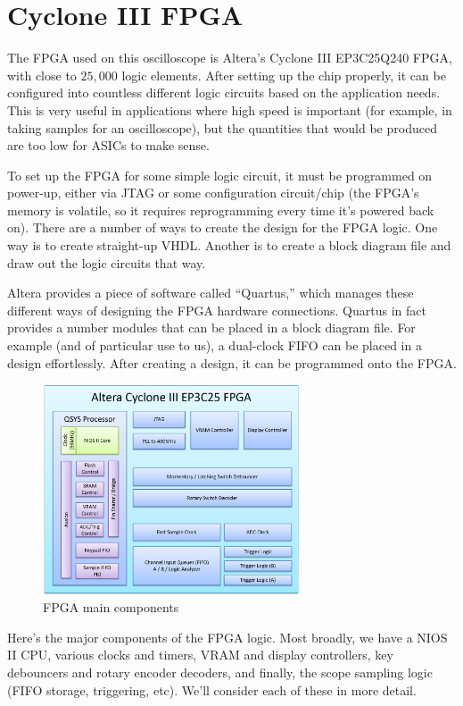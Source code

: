 \section{Cyclone III FPGA}
The FPGA used on this oscilloscope is Altera's Cyclone III EP3C25Q240 FPGA, with close to $25,000$ logic elements. After setting up the chip properly, it can be configured into countless different logic circuits based on the application needs. This is very useful in applications where high speed is important (for example, in taking samples for an oscilloscope), but the quantities that would be produced are too low for ASICs to make sense.

To set up the FPGA for some simple logic circuit, it must be programmed on power-up, either via JTAG or some configuration circuit/chip (the FPGA's memory is volatile, so it requires reprogramming every time it's powered back on). There are a number of ways to create the design for the FPGA logic. One way is to create straight-up VHDL. Another is to create a block diagram file and draw out the logic circuits that way.

Altera provides a piece of software called ``Quartus,'' which manages these different ways of designing the FPGA hardware connections. Quartus in fact provides a number modules that can be placed in a block diagram file. For example (and of particular use to us), a dual-clock FIFO can be placed in a design effortlessly. After creating a design, it can be programmed onto the FPGA.

\begin{figure}[ht!]
    \centering
    \includegraphics[width=3in]{block_diagrams/fpga.png}
		\caption{FPGA main components}
\end{figure}

Here's the major components of the FPGA logic. Most broadly, we have a NIOS II CPU, various clocks and timers, VRAM and display controllers, key debouncers and rotary encoder decoders, and finally, the scope sampling logic (FIFO storage, triggering, etc). We'll consider each of these in more detail.

